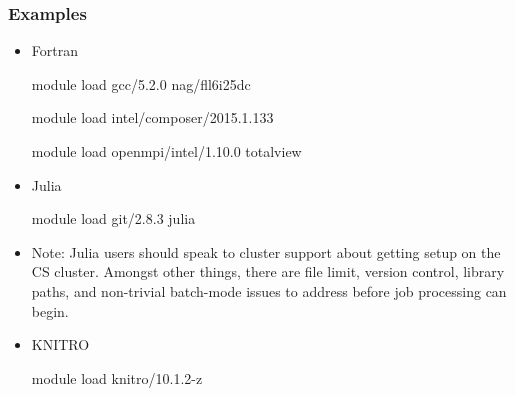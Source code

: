 \documentclass{beamer}
\begin{document}
\begin{frame}
\frametitle{Examples}
\begin{itemize}
\item Fortran \vspace{0.2cm}
\begin{semiverbatim}
module load gcc/5.2.0 nag/fll6i25dc 
\end{semiverbatim}
\vspace{-0.4cm}
\begin{semiverbatim}
module load intel/composer/2015.1.133
\end{semiverbatim} \vspace{-0.4cm}
\begin{semiverbatim}
module load openmpi/intel/1.10.0 totalview
\end{semiverbatim}
\item Julia
\vspace{0.2cm}
\begin{semiverbatim}
module load git/2.8.3 julia
\end{semiverbatim}
\item Note: Julia users should speak to cluster support about getting setup on the CS cluster. Amongst other things, there are file limit, version control, library paths, and non-trivial batch-mode issues to address before job processing can begin.
\item KNITRO
\vspace{0.2cm}
\begin{semiverbatim}
module load knitro/10.1.2-z
\end{semiverbatim}
\end{itemize}
\end{frame}
\end{document}

